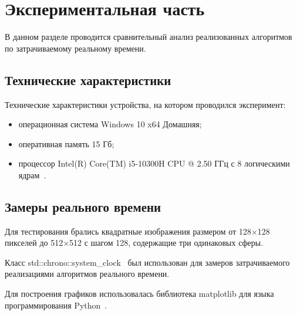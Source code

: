 \section{Экспериментальная часть}

В данном разделе проводится сравнительный анализ реализованных алгоритмов по затрачиваемому реальному времени.

\subsection{Технические характеристики}
Технические характеристики устройства, на котором проводился эксперимент:
\begin{itemize}
	\item операционная система Windows 10 x64 Домашняя;
	\item оперативная память 15 Гб;
	\item процессор Intel(R) Core(TM) i5-10300H CPU @ 2.50 ГГц с 8 логическими ядрам~\cite{processor}.
\end{itemize}

\subsection{Замеры реального времени}
Для тестирования брались квадратные изображения размером от 128$\times$128 пикселей до 512$\times$512 с шагом 128, содержащие три одинаковых сферы. 

Класс std::chrono::system\_clock~\cite{clock} был использован для замеров затрачиваемого реализациями алгоритмов реального времени.

Для построения графиков использовалась библиотека matplotlib для языка программирования Python~\cite{mpl}.

